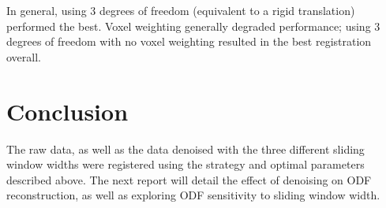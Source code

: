 \documentclass{article}
\begin{document}
In general, using 3 degrees of freedom (equivalent to a rigid translation)
performed the best. Voxel weighting generally degraded performance;
using 3 degrees of freedom with no voxel weighting resulted in the best
registration overall.

\section{Conclusion}
The raw data, as well as the data denoised with the three different sliding
window widths were registered using the strategy and optimal parameters
described above. The next report will detail the effect of denoising on ODF
reconstruction, as well as exploring ODF sensitivity to sliding window width.



\end{document}

